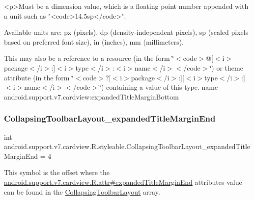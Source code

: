 \begin{DoxyVerb}      <p>Must be a dimension value, which is a floating point number appended with a unit such as "<code>14.5sp</code>".
\end{DoxyVerb}
 Available units are\+: px (pixels), dp (density-\/independent pixels), sp (scaled pixels based on preferred font size), in (inches), mm (millimeters). 

This may also be a reference to a resource (in the form \char`\"{}$<$code$>$@\mbox{[}$<$i$>$package$<$/i$>$\+:\mbox{]}$<$i$>$type$<$/i$>$\+:$<$i$>$name$<$/i$>$$<$/code$>$\char`\"{}) or theme attribute (in the form \char`\"{}$<$code$>$?\mbox{[}$<$i$>$package$<$/i$>$\+:\mbox{]}\mbox{[}$<$i$>$type$<$/i$>$\+:\mbox{]}$<$i$>$name$<$/i$>$$<$/code$>$\char`\"{}) containing a value of this type.  name android.\+support.\+v7.\+cardview\+:expanded\+Title\+Margin\+Bottom \mbox{\label{classandroid_1_1support_1_1v7_1_1cardview_1_1R_1_1styleable_a9ba764a19d59fb616535b8b928a3ab0c}} 
\subsubsection{\texorpdfstring{Collapsing\+Toolbar\+Layout\+\_\+expanded\+Title\+Margin\+End}{CollapsingToolbarLayout\_expandedTitleMarginEnd}}
{\footnotesize\ttfamily int android.\+support.\+v7.\+cardview.\+R.\+styleable.\+Collapsing\+Toolbar\+Layout\+\_\+expanded\+Title\+Margin\+End = 4\hspace{0.3cm}{\ttfamily [static]}}

This symbol is the offset where the \hyperlink{classandroid_1_1support_1_1v7_1_1cardview_1_1R_1_1attr_a10240d18a9a9b1a56ef4e7a06d966013}{android.\+support.\+v7.\+cardview.\+R.\+attr\#expanded\+Title\+Margin\+End} attribute\textquotesingle{}s value can be found in the \hyperlink{classandroid_1_1support_1_1v7_1_1cardview_1_1R_1_1styleable_a3b4c5393d0c99cb4e5a7a3911fc606b4}{Collapsing\+Toolbar\+Layout} array.

